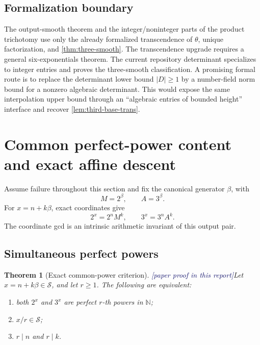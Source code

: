 \documentclass[11pt,oneside]{article}
\newtheorem{theorem}{Theorem}[section]
\theoremstyle{definition}
\newcommand{\N}{\mathbb N}
\newcommand{\Sol}{\mathcal S}
\newcommand{\tagPaper}{\textcolor{MidnightBlue}{\textsf{[paper proof in this report]}}}
\begin{document}
\subsection{Formalization boundary}

The output-smooth theorem and the integer/noninteger parts of the product trichotomy use
only the already formalized transcendence of \(\theta\), unique factorization, and
\cref{thm:three-smooth}.  The transcendence upgrade requires a general
six-exponentials theorem.  The current repository determinant specializes to integer
entries and proves the three-smooth classification.  A promising formal route is to
replace the determinant lower bound \(|D|\ge1\) by a number-field norm bound for a nonzero
algebraic determinant.  This would expose the same interpolation upper bound through an
``algebraic entries of bounded height'' interface and recover
\cref{lem:third-base-trans}.

\section{Common perfect-power content and exact affine descent}\label{sec:perfect-powers}

Assume failure throughout this section and fix the canonical generator \(\beta\), with
\[
  M=2^\beta,\qquad A=3^\beta.
\]
For \(x=n+k\beta\), exact coordinates give
\begin{equation}\label{eq:output-coordinates}
  2^x=2^nM^k,
  \qquad
  3^x=3^nA^k.
\end{equation}
The coordinate gcd is an intrinsic arithmetic invariant of this output pair.

\subsection{Simultaneous perfect powers}

\begin{theorem}[Exact common-power criterion]\label{thm:common-power}
\tagPaper Let \(x=n+k\beta\in\Sol\), and let \(r\ge1\).  The following are equivalent:
\begin{enumerate}[label=\textup{(\roman*)}]
\item both \(2^x\) and \(3^x\) are perfect \(r\)-th powers in \(\N\);
\item \(x/r\in\Sol\);
\item \(r\mid n\) and \(r\mid k\).
\end{enumerate}
\end{theorem}
\end{document}
